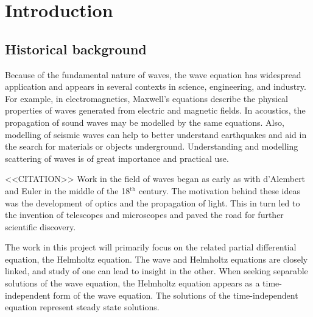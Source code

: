 \chapter{Introduction}


\iffalse Brief outline of the chapter below

Background:
	What is HH equation?
	What does it model?
	How is it derived?
	Boundary conditions
	- 	Sommerfield radiation condition
	
Finite element method:
	Discretisation of HH
	Discretisation of infinite domains
		D,N,radiation
	ABC, DtN, PML

Linear solvers:
	Iterative and direct
	Krylov methods
	Preconditioners
	How does this relate to Poisson and HH?
	- 	Small wavenumbers good convergence

Project direction:
	Where are we going? What to do...?
	Multigrid in non-cartesian coordinates
	Fourier decompostion of HH
	Explore implementation of PMLs
\fi


\section{Historical background}

\iffalse
Motivation.
Who cares? Why is it difficult?
What are the benefits?
Need some citations? Names in the field...
\fi



Because of the fundamental nature of waves, the wave equation has widespread application and appears in several contexts in science, engineering, and industry.
For example, in electromagnetics, Maxwell's equations describe the physical properties of waves generated from electric and magnetic fields.
In acoustics, the propagation of sound waves may be modelled by the same equations.
Also, modelling of seismic waves can help to better understand earthquakes and aid in the search for materials or objects underground.
Understanding and modelling scattering of waves is of great importance and practical use.

<<CITATION>>
Work in the field of waves began as early as with d'Alembert and Euler in the middle of the 18$^\text{th}$ century.
The motivation behind these ideas was the development of optics and the propagation of light.
This in turn led to the invention of telescopes and microscopes and paved the road for further scientific discovery.

The work in this project will primarily focus on the related partial differential equation, the Helmholtz equation.
The wave and Helmholtz equations are closely linked, and study of one can lead to insight in the other.
When seeking separable solutions of the wave equation, the Helmholtz equation appears as a time-independent form of the wave equation.
The solutions of the time-independent equation represent steady state solutions.

